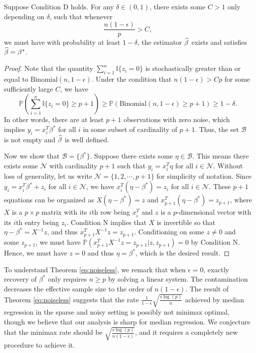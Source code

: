 \begin{thm}\label{eq:noiseless}
Suppose Condition D holds. For any $\delta\in(0,1)$, there exists some $C>1$ only depending on $\delta$, such that whenever
$$\frac{n(1-\epsilon)}{p}>C,$$
we must have with probability at least $1-\delta$, the estimator $\widehat{\beta}$ exists and satisfies $\widehat{\beta}=\beta^*$.
\end{thm}
\begin{proof}
Note that the quantity $\sum_{i=1}^n\mathbb{I}\{z_i=0\}$ is stochastically greater than or equal to $\text{Binomial}(n,1-\epsilon)$. Under the condition that $n(1-\epsilon)>Cp$ for some sufficiently large $C$, we have
$$\mathbb{P}\left(\sum_{i=1}^n\mathbb{I}\{z_i=0\}\geq p+1\right)\geq \mathbb{P}\left(\text{Binomial}(n,1-\epsilon)\geq p+1\right)\geq 1-\delta.$$
In other words, there are at least $p+1$ observations with zero noise, which implies $y_i=x_i^T\beta^*$ for all $i$ in some subset of cardinality of $p+1$. Thus, the set $\mathcal{B}$ is not empty and $\widehat{\beta}$ is well defined.

Now we show that $\mathcal{B}=\{\beta^*\}$. Suppose there exists some $\eta\in\mathcal{B}$. This means there exists some $\mathcal{N}$ with cardinality $p+1$ such that $y_i=x_i^T\eta$ for all $i\in\mathcal{N}$. Without loss of generality, let us write $\mathcal{N}=\{1,2,\cdots,p+1\}$ for simplicity of notation. Since $y_i=x_i^T\beta^*+z_i$ for all $i\in\mathcal{N}$, we have $x_i^T(\eta-\beta^*)=z_i$ for all $i\in\mathcal{N}$. These $p+1$ equations can be organized as $X(\eta-\beta^*)=z$ and $x_{p+1}^T(\eta-\beta^*)=z_{p+1}$, where $X$ is a $p\times p$ matrix with its $i$th row being $x_i^T$ and $z$ is a $p$-dimensional vector with its $i$th entry being $z_i$. Condition N implies that $X$ is invertible so that $\eta-\beta^*=X^{-1}z$, and thus $x_{p+1}^TX^{-1}z=z_{p+1}$. Conditioning on some $z\neq 0$ and some $z_{p+1}$, we must have $\mathbb{P}\left(x_{p+1}^TX^{-1}z=z_{p+1}|z,z_{p+1}\right)=0$ by Condition N. Hence, we must have $z=0$ and thus $\eta=\beta^*$, which is the desired result.
\end{proof}

To understand Theorem \ref{eq:noiseless}, we remark that when $\epsilon=0$, exactly recovery of $\beta^*$ only requires $n\geq p$ by solving a linear system. The contamination decreases the effective sample size to the order of $n(1-\epsilon)$. The result of Theorem \ref{eq:noiseless} suggests that the rate $\frac{1}{1-\epsilon}\sqrt{\frac{s\log(p)}{n}}$ achieved by median regression in the sparse and noisy setting is possibly not minimax optimal, though we believe that our analysis is sharp for median regression. We conjecture that the minimax rate should be $\sqrt{\frac{s\log(p)}{n(1-\epsilon)}}$, and it requires a completely new procedure to achieve it. 



